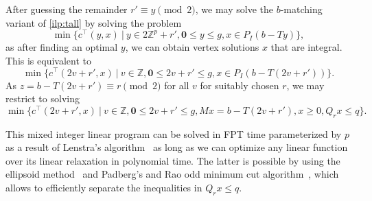 \documentclass[a4paper,UKenglish,cleveref,thm-restate]{lipics-v2021}
\newcommand{\Z}{\mathbb Z}
\newcommand{\veczero}{\mathbf0}
\begin{document}
After guessing the remainder $r'\equiv y\pmod2$, we may solve the $b$-matching variant of \cref{ilp:tall} by solving the problem
\[
    \min\{c^\top(y,x)\ \vert\ y\in2\Z^p+r',\veczero\le y\le g,x\in P_I(b-Ty)\},
\]
as after finding an optimal $y$, we can obtain vertex solutions $x$ that are integral. This is equivalent to
\[
    \min\{c^\top(2v+r',x)\ \vert\ v\in\Z,\veczero\le 2v+r'\le g,x\in P_I(b-T(2v+r'))\}.
\]
As $z=b-T(2v+r')\equiv r\pmod2$ for all $v$ for suitably chosen $r$, we may restrict to solving
\[
    \min\{c^\top(2v+r',x)\ \vert\ v\in\Z,\veczero\le 2v+r'\le g,Mx=b-T(2v+r'),x\ge0,Q_rx\le q\}.
\]

This mixed integer linear program can be solved in FPT time parameterized by $p$ as a result of Lenstra's algorithm~\cite{DBLP:journals/mor/Lenstra83} as long as we can optimize any linear function over its linear relaxation in polynomial time. The latter is possible by using the ellipsoid method~\cite{DBLP:books/sp/GLS1988} and Padberg's and Rao odd minimum cut algorithm~\cite{DBLP:journals/mor/PadbergR82}, which allows to efficiently separate the inequalities in $Q_rx\le q$. 
\end{document}
